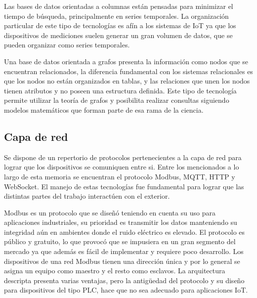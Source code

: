 Las bases de datos orientadas a columnas están pensadas para minimizar el tiempo de búsqueda, principalmente en series temporales.
La organización particular de este tipo de tecnologías es afín a los sistemas de IoT ya que los dispositivos de mediciones suelen generar un gran volumen de datos, que se pueden organizar como series temporales.

Una base de datos orientada a grafos presenta la información como nodos que se encuentran relacionados, la diferencia fundamental con los sistemas relacionales es que los nodos no están organizados en tablas, y las relaciones que unen los nodos tienen atributos y no poseen una estructura definida.
Este tipo de tecnología permite utilizar la teoría de grafos y posibilita realizar consultas siguiendo modelos matemáticos que forman parte de esa rama de la ciencia.


\newpage

\subsection{Capa de red}
Se dispone de un repertorio de protocolos pertenecientes a la capa de red para lograr que los dispositivos se comuniquen entre si.
Entre los mencionados a lo largo de esta memoria se encuentran el protocolo Modbus, MQTT, HTTP y WebSocket. El manejo de estas tecnologías fue fundamental para lograr que las distintas partes del trabajo interactúen con el exterior.

Modbus es un protocolo que se diseñó teniendo en cuenta su uso para aplicaciones industriales, su prioridad es transmitir los datos manteniendo su integridad aún en ambientes donde el ruido eléctrico es elevado. El protocolo es público y gratuito, lo que provocó que se impusiera en un gran segmento del mercado ya que además es fácil de implementar y requiere poco desarrollo. Los dispositivos de una red Modbus tienen una dirección única y por lo general se asigna un equipo como maestro y el resto como esclavos. La arquitectura descripta presenta varias ventajas, pero la antigüedad del protocolo y su diseño para dispositivos del tipo PLC, hace que no sea adecuado para aplicaciones IoT.

